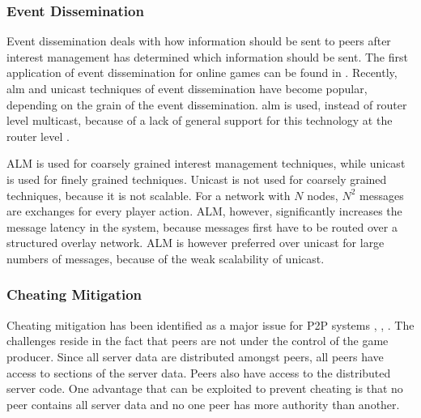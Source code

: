 \documentclass[journal,oneside,a4paper,onecolumn]{IEEEtran}
\begin{document}

\subsubsection{Event Dissemination}
Event dissemination deals with how information should be sent to peers after interest management has determined which information should be sent. The first application of event dissemination for online games can be found in \cite{first_GED}. Recently, \ac{alm} and unicast techniques of event dissemination have become popular, depending on the grain of the event dissemination. \ac{alm} is used, instead of router level multicast, because of a lack of general support for this technology at the router level \cite{ip_multicast_deployment_issues}.

ALM is used for coarsely grained interest management techniques, while unicast is used for finely grained techniques. Unicast is not used for coarsely grained techniques, because it is not scalable. For a network with $N$ nodes, $N^2$ messages are exchanges for every player action. ALM, however, significantly increases the message latency in the system, because messages first have to be routed over a structured overlay network. ALM is however preferred over unicast for large numbers of messages, because of the weak scalability of unicast.

\subsubsection{Cheating Mitigation}
\label{key_challenges_cheating}

Cheating mitigation has been identified as a major issue for P2P systems \cite{knutsson_p2p_first}, \cite{challenges_p2p_gaming}, \cite{cheat_proof_event_ordering}. The challenges reside in the fact that peers are not under the control of the game producer. Since all server data are distributed amongst peers, all peers have access to sections of the server data. Peers also have access to the distributed server code. One advantage that can be exploited to prevent cheating is that no peer contains all server data and no one peer has more authority than another.
\end{document}
